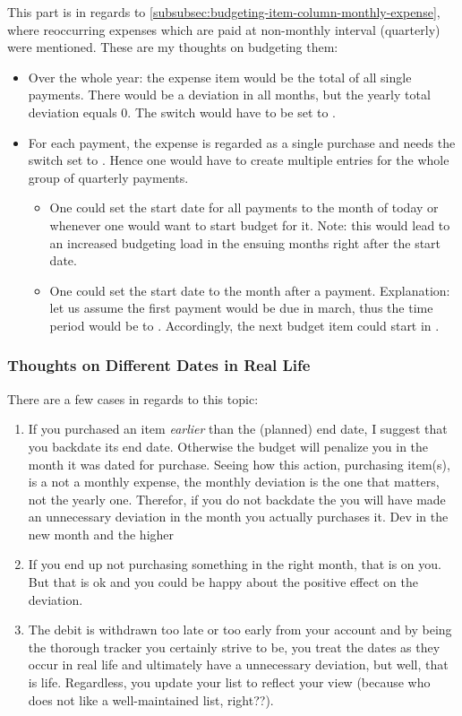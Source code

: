 This part is in regards to \autoref{subsubsec:budgeting-item-column-monthly-expense}, where reoccurring expenses which are paid at non-monthly interval (\eg quarterly) were mentioned.
These are my thoughts on budgeting them:
\begin{itemize}
	\item Over the whole year: the expense item would be the total of all single payments.
	There would be a deviation in all months, but the yearly total deviation equals 0.
	The  switch would have to be set to .
	\item For each payment, \ie the expense is regarded as a single purchase and needs the  switch set to .
	Hence one would have to create multiple entries for the whole group of quarterly payments.
	\begin{itemize}
		\item One could set the start date for all payments to the month of today or whenever one would want to start budget for it.
		Note: this would lead to an increased budgeting load in the ensuing months right after the start date.
		\item One could set the start date to the month after a payment.
		Explanation: let us assume the first payment would be due in march, thus the time period would be  to .
		Accordingly, the next budget item could start in .
	\end{itemize}
\end{itemize}

\subsubsection{Thoughts on Different Dates in Real Life}
\label{subsubsec:thoughts-different-dates}

There are a few cases in regards to this topic:
\begin{enumerate}
	\item If you purchased an item \emph{earlier} than the (planned) end date, I suggest that you backdate its end date.
	Otherwise the budget will penalize you in the month it was dated for purchase.
	Seeing how this action, \ie purchasing item(s), is a not a monthly expense, the monthly deviation is the one that matters, not the yearly one.
	Therefor, if you do not backdate the you will have made an unnecessary deviation in the month you actually purchases it.
	Dev in the new month and the higher 
	\item If you end up not purchasing something in the right month, that is on you.
	But that is ok and you could be happy about the positive effect on the deviation.
	\item The debit is withdrawn too late or too early from your account and by being the thorough tracker you certainly strive to be, you treat the dates as they occur in real life and ultimately have a unnecessary deviation, but well, that is life.
	Regardless, you update your list to reflect your view 	(because who does not like a well-maintained list, right??).
\end{enumerate}

